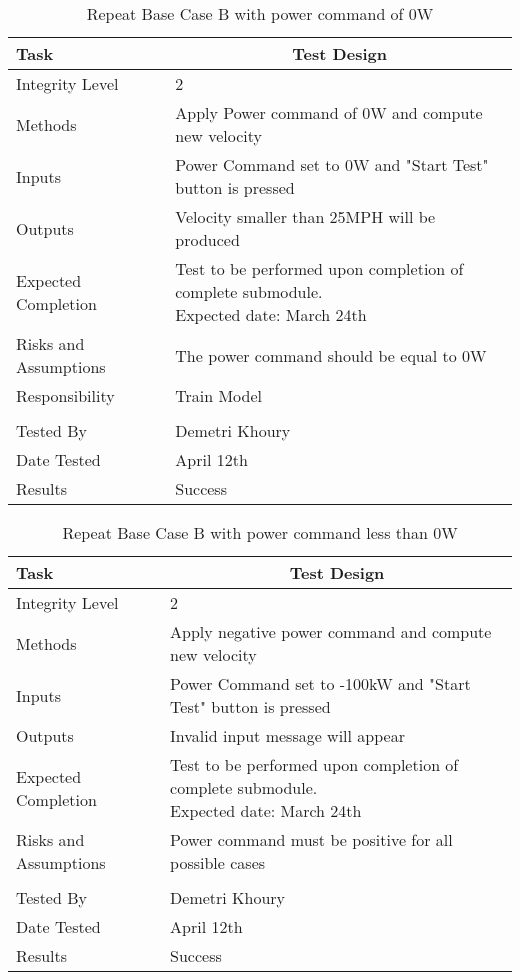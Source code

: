 \documentclass[]{article}
\begin{document}
	\begin{table}[H]
		\centering
		\caption{Repeat Base Case B with power command of 0W }
		\begin{tabular}{|l|l|}
			\hline
			Task & \multicolumn{1}{c|}{Test Design} \\ \hline
			Integrity Level & 2 \\ \hline
			Methods & Apply Power command of 0W and compute new velocity  \\ \hline
			Inputs &  Power Command set to 0W and "Start Test" button is pressed \\ \hline
			Outputs &  Velocity smaller than 25MPH will be produced  \\ \hline
			Expected Completion & \parbox[t]{10cm}{Test to be performed upon completion of complete submodule.\\ Expected date: March 24th}\\ \hline
			Risks and Assumptions & The power command should be equal to 0W \\ \hline
			Responsibility & Train Model\\ \hline
			\\ \hline
			Tested By   &  Demetri Khoury\\	\hline
			Date Tested & \parbox[t]{10cm}{April 12th}\\ \hline
			Results & Success\\ \hline
		\end{tabular}
	\end{table}

	\begin{table}[H]
		\centering
		\caption{Repeat Base Case B with power command less than 0W }
		\begin{tabular}{|l|l|}
			\hline
			Task & \multicolumn{1}{c|}{Test Design} \\ \hline
			Integrity Level & 2 \\ \hline
			Methods & Apply negative power command and compute new velocity  \\ \hline
			Inputs &  Power Command set to -100kW and "Start Test" button is pressed \\ \hline
			Outputs &  Invalid input message will appear  \\ \hline
			Expected Completion & \parbox[t]{10cm}{Test to be performed upon completion of complete submodule.\\ Expected date: March 24th}\\ \hline
			Risks and Assumptions & Power command must be positive for all possible cases\\ \hline
			\\ \hline
			Tested By   &  Demetri Khoury\\	\hline
			Date Tested & \parbox[t]{10cm}{April 12th}\\ \hline
			Results & Success\\ \hline
		\end{tabular}
	\end{table}
\end{document}
